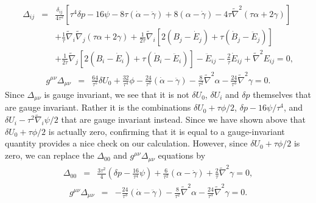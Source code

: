 %
\begin{eqnarray}
\Delta_{ij}&=&\frac{\delta_{ij}}{4\tau^2}\left[\tau^4\delta p-16\psi-8\tau(\dot{\alpha}-\ddot{\gamma})+8(\alpha-\dot{\gamma})-4\tau \tilde{\nabla}^2(\tau\alpha+2\gamma)\right]
\nonumber\\
&&+\frac{1}{\tau}\tilde{\nabla}_i\tilde{\nabla}_j(\tau\alpha+2\gamma) +\frac{1}{2\tau}\tilde{\nabla}_i[2(B_j-\dot{E}_j)+\tau(\dot{B}_j-\ddot{E}_j)]
\nonumber\\
&&+\frac{1}{2\tau}\tilde{\nabla}_j[2(B_i-\dot{E}_i)+\tau(\dot{B}_i-\ddot{E}_i)]
-\ddot{E}_{ij}-\frac{2}{\tau}\dot{E}_{ij}+\tilde{\nabla}^2E_{ij}=0,
\label{8.10}
\end{eqnarray}
%
\begin{eqnarray}
g^{\mu\nu}\Delta_{\mu\nu}&=&\frac{64}{\tau^5}\delta U_0+\frac{32}{\tau^4}\phi -\frac{24}{\tau^3}(\dot{\alpha}-\ddot{\gamma})-\frac{8}{\tau^2}\tilde{\nabla}^2\alpha-\frac{24}{\tau^3}\tilde{\nabla}^2\gamma=0.
\label{8.11}
\end{eqnarray}
%
Since $\Delta_{\mu\nu}$ is gauge invariant, we see that it is not $\delta U_0$, $\delta U_i$ and $\delta p$ themselves that are gauge invariant. Rather it is the combinations $\delta U_0+\tau\phi/2$, $\delta p-16\psi/\tau^4$, and $\delta U_i-\tau^2\tilde{\nabla}_i\psi/2$ that are gauge invariant instead. Since we have shown above that $\delta U_0+\tau\phi/2$ is actually zero, confirming that it is equal to a gauge-invariant quantity provides a nice check on our calculation. However, since $\delta U_0+\tau\phi/2$ is zero, we can replace the $\Delta_{00}$ and $g^{\mu\nu}\Delta_{\mu\nu}$ equations by 
%
\begin{eqnarray}
\Delta_{00}&=&\frac{3\tau^2}{4}\left(\delta p -\frac{16}{\tau^4}\psi\right)
+\frac{6}{\tau^2}(\alpha-\dot{\gamma})+\frac{2}{\tau}\tilde{\nabla}^2\gamma=0,
\label{8.12}
\end{eqnarray}
%
%
\begin{eqnarray}
g^{\mu\nu}\Delta_{\mu\nu}&=& -\frac{24}{\tau^3}(\dot{\alpha}-\ddot{\gamma})-\frac{8}{\tau^2}\tilde{\nabla}^2\alpha-\frac{24}{\tau^3}\tilde{\nabla}^2\gamma=0.
\label{8.13}
\end{eqnarray}
%

